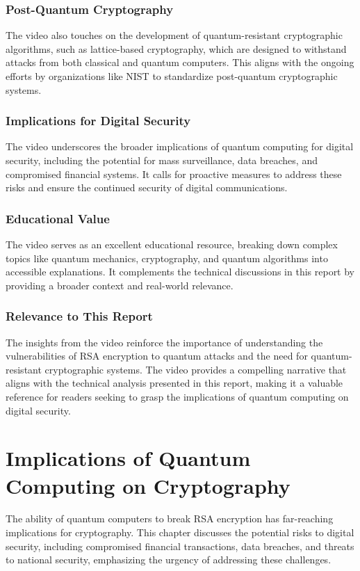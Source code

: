 \documentclass[12pt,a4paper]{report}
\begin{document}
\subsection{Post-Quantum Cryptography}
The video also touches on the development of quantum-resistant cryptographic algorithms, such as lattice-based cryptography, which are designed to withstand attacks from both classical and quantum computers. This aligns with the ongoing efforts by organizations like NIST to standardize post-quantum cryptographic systems.

\subsection{Implications for Digital Security}
The video underscores the broader implications of quantum computing for digital security, including the potential for mass surveillance, data breaches, and compromised financial systems. It calls for proactive measures to address these risks and ensure the continued security of digital communications.

\subsection{Educational Value}
The video serves as an excellent educational resource, breaking down complex topics like quantum mechanics, cryptography, and quantum algorithms into accessible explanations. It complements the technical discussions in this report by providing a broader context and real-world relevance.

\subsection{Relevance to This Report}
The insights from the video reinforce the importance of understanding the vulnerabilities of RSA encryption to quantum attacks and the need for quantum-resistant cryptographic systems. The video provides a compelling narrative that aligns with the technical analysis presented in this report, making it a valuable reference for readers seeking to grasp the implications of quantum computing on digital security.

\chapter{Implications of Quantum Computing on Cryptography}
The ability of quantum computers to break RSA encryption has far-reaching implications for cryptography. This chapter discusses the potential risks to digital security, including compromised financial transactions, data breaches, and threats to national security, emphasizing the urgency of addressing these challenges.
\end{document}
